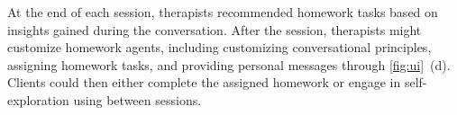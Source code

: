 
At the end of each session, therapists recommended homework tasks based on insights gained during the conversation. After the session, therapists might customize homework agents, including customizing conversational principles, assigning homework tasks, and providing personal messages through \autoref{fig:ui}~(d). Clients could then either complete the assigned homework or engage in self-exploration using \name{} between sessions.



